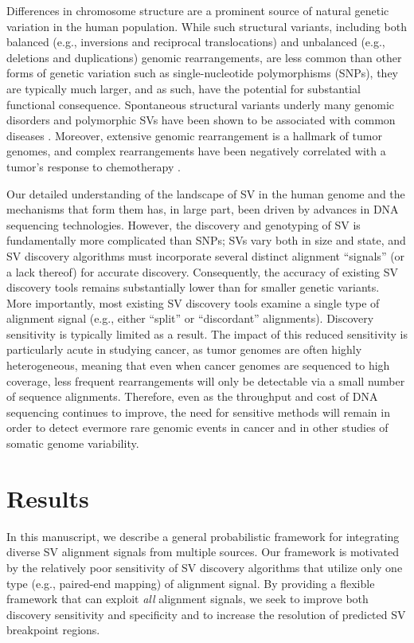 \documentclass[11pt]{article}
\begin{document}
Differences in chromosome structure are a prominent source of natural 
genetic variation in the human population. While such structural variants,
including both balanced (e.g., inversions and reciprocal translocations)
and unbalanced (e.g., deletions and duplications) genomic rearrangements, are 
less common than other forms of genetic variation such as single-nucleotide 
polymorphisms (SNPs), they are typically much larger, and as such, have the 
potential for substantial functional consequence. Spontaneous structural
variants underly many genomic disorders and polymorphic SVs have been shown to
be associated with common diseases \cite{mccarroll2007}. Moreover, extensive
genomic rearrangement is a hallmark of tumor genomes, and complex rearrangements
have been negatively correlated with a tumor's response to chemotherapy
\cite{rausch2012a}.

Our detailed understanding of the landscape of SV in the human genome and the
mechanisms that form them has, in large part, been driven by advances in DNA
sequencing technologies. However, the discovery and genotyping of SV is 
fundamentally more complicated than SNPs; SVs vary both in size and state, 
and SV discovery algorithms must incorporate several distinct alignment 
``signals'' (or a lack thereof) for accurate discovery. Consequently, the
accuracy of existing SV discovery tools remains substantially lower than for
smaller genetic variants. More importantly, most existing SV discovery
tools examine a single type of alignment signal (e.g., either ``split'' or 
``discordant'' alignments). Discovery sensitivity is typically limited as a 
result. The impact of this reduced sensitivity is particularly acute in studying 
cancer, as tumor genomes are often highly heterogeneous, meaning that even 
when cancer genomes are sequenced to high coverage, less frequent rearrangements 
will only be detectable via a small number of sequence alignments. Therefore,
even as the throughput and cost of DNA sequencing continues to improve, the
need for sensitive methods will remain in order to detect evermore rare
genomic events in cancer and in other studies of somatic genome variability.



\section{Results}

In this manuscript, we describe a general probabilistic framework for 
integrating diverse SV alignment signals from multiple sources. Our framework is
motivated by the relatively poor sensitivity of SV discovery algorithms
that utilize only one type (e.g., paired-end mapping) of alignment signal.
By providing a flexible framework that can exploit \emph{all} alignment signals,
we seek to improve both discovery sensitivity and specificity and to increase 
the resolution of predicted SV breakpoint regions.
\end{document}
